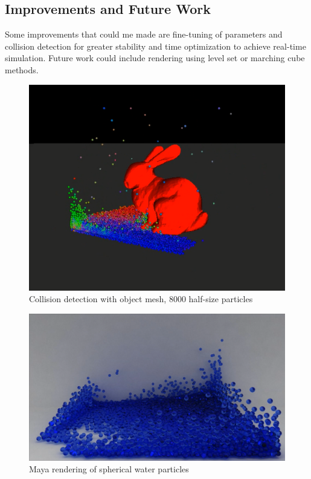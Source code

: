 \documentclass[conference]{IEEEtran}
\begin{document}
\subsection*{Improvements and Future Work}
Some improvements that could me made are fine-tuning of parameters and collision detection for greater stability and time optimization to achieve real-time simulation. Future work could include rendering using level set or marching cube methods. 
\begin{figure}[H]
\centering
\includegraphics[width=1.0\linewidth]{bunny-1000-small.png}
\caption{Collision detection with object mesh, 8000 half-size particles}
\label{fig:collision_obj}
\end{figure}
\begin{figure}[H]
\centering
\includegraphics[width=1.0\linewidth]{compare_maya.png}
\caption{Maya rendering of spherical water particles}
\label{fig:maya_render}
\end{figure}
\end{document}
